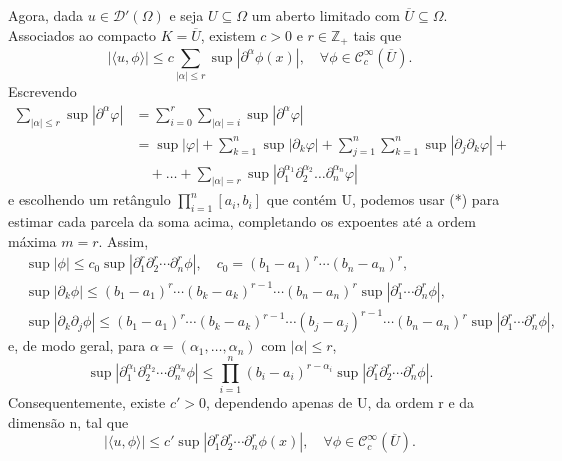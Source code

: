 \documentclass[../distribution_theory_notes.tex]{subfiles}
\begin{document}
Agora, dada \(u\in \mathcal{D}'(\Omega )\) e seja \(U\subseteq \Omega \) um aberto limitado com \(\overline{U}\subseteq \Omega \). Associados ao compacto \(K=\overline{U}\), existem \(c>0\) e \(r\in \mathbb{Z}_{+}\) tais que
\[
	| \langle u, \phi  \rangle |
	\leq c\sum\limits_{| \alpha  |\leq r}^{}\sup | \partial^{\alpha }\phi (x) |,
	\quad \forall \phi \in \mathcal{C}_{c}^{\infty}(\overline{U}).
\]
Escrevendo
\begin{align*}
	\sum\limits_{| \alpha  |\leq r}^{}\sup_{}| \partial^{\alpha }\varphi  | & = \sum\limits_{i=0}^{r}\sum\limits_{| \alpha  |=i}^{}\sup_{}| \partial^{\alpha }\varphi  |                                                                           \\
	                                                                        & = \sup_{}| \varphi  |+\sum\limits_{k=1}^{n}\sup_{}| \partial_{k}\varphi  | + \sum\limits_{j=1}^{n}\sum\limits_{k=1}^{n}\sup_{}| \partial_{j}\partial_{k}\varphi  | + \\
	                                                                        & \quad +\dotsc + \sum\limits_{| \alpha  |=r}^{}\sup_{}| \partial_{1}^{\alpha_1}\partial_{2}^{\alpha_2}\dotsc \partial_{n}^{\alpha_{n}}\varphi  |
\end{align*}
e escolhendo um retângulo \(\prod_{i=1}^{n}[a_{i},b_{i}]\) que contém U, podemos usar (*) para estimar cada parcela da soma acima, completando os expoentes até a ordem máxima \(m=r\). Assim,
\begin{align*}
	 & \sup | \phi |  \leq c_{0}\sup | \partial_{1}^{r}\partial_{2}^{r}\cdots \partial_{n}^{r}\phi |,
	\quad c_{0}=(b_{1}-a_{1})^{r}\cdots (b_{n}-a_{n})^{r},                                            \\
	 & \sup | \partial_{k}\phi |
	\leq (b_{1}-a_{1})^{r}\cdots (b_{k}-a_{k})^{r-1}\cdots (b_{n}-a_{n})^{r}
	\sup | \partial_{1}^{r}\cdots \partial_{n}^{r}\phi |,                                             \\
	 & \sup | \partial_{k}\partial_{j}\phi |
	\leq (b_{1}-a_{1})^{r}\cdots (b_{k}-a_{k})^{r-1}\cdots (b_{j}-a_{j})^{r-1}\cdots (b_{n}-a_{n})^{r}
	\sup | \partial_{1}^{r}\cdots \partial_{n}^{r}\phi |,
\end{align*}
e, de modo geral, para \(\alpha = (\alpha_{1},\dotsc ,\alpha_{n})\) com \(| \alpha  |\leq r\),
\[
	\sup | \partial_{1}^{\alpha_{1}}\partial_{2}^{\alpha_{2}}\cdots \partial_{n}^{\alpha_{n}}\phi |
	\leq \prod_{i=1}^{n}(b_{i}-a_{i})^{r-\alpha_{i}}
	\sup | \partial_{1}^{r}\partial_{2}^{r}\cdots \partial_{n}^{r}\phi |.
\]
Consequentemente, existe \(c'>0\), dependendo apenas de U, da ordem r e da dimensão n, tal que
\[
	| \langle u, \phi  \rangle |
	\leq c'\sup | \partial_{1}^{r}\partial_{2}^{r}\cdots \partial_{n}^{r}\phi (x) |,
	\quad \forall \phi \in \mathcal{C}_{c}^{\infty}(\overline{U}). \tag{**}
\]
\end{document}

